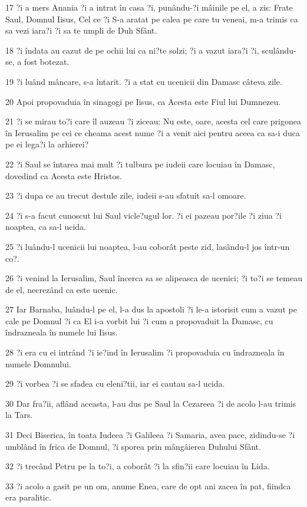 \par 17 ?i a mers Anania ?i a intrat în casa ?i, punându-?i mâinile pe el, a zis: Frate Saul, Domnul Iisus, Cel ce ?i S-a aratat pe calea pe care tu veneai, m-a trimis ca sa vezi iara?i ?i sa te umpli de Duh Sfânt.
\par 18 ?i îndata au cazut de pe ochii lui ca ni?te solzi; ?i a vazut iara?i ?i, sculându-se, a fost botezat.
\par 19 ?i luând mâncare, s-a întarit. ?i a stat cu ucenicii din Damasc câteva zile.
\par 20 Apoi propovaduia în sinagogi pe Iisus, ca Acesta este Fiul lui Dumnezeu.
\par 21 ?i se mirau to?i care îl auzeau ?i ziceau: Nu este, oare, acesta cel care prigonea în Ierusalim pe cei ce cheama acest nume ?i a venit aici pentru aceea ca sa-i duca pe ei lega?i la arhierei?
\par 22 ?i Saul se întarea mai mult ?i tulbura pe iudeii care locuiau în Damasc, dovedind ca Acesta este Hristos.
\par 23 ?i dupa ce au trecut destule zile, iudeii s-au sfatuit sa-l omoare.
\par 24 ?i s-a facut cunoscut lui Saul vicle?ugul lor. ?i ei pazeau por?ile ?i ziua ?i noaptea, ca sa-l ucida.
\par 25 ?i luându-l ucenicii lui noaptea, l-au coborât peste zid, lasându-l jos într-un co?.
\par 26 ?i venind la Ierusalim, Saul încerca sa se alipeasca de ucenici; ?i to?i se temeau de el, necrezând ca este ucenic.
\par 27 Iar Barnaba, luându-l pe el, l-a dus la apostoli ?i le-a istorisit cum a vazut pe cale pe Domnul ?i ca El i-a vorbit lui ?i cum a propovaduit la Damasc, cu îndrazneala în numele lui Iisus.
\par 28 ?i era cu ei intrând ?i ie?ind în Ierusalim ?i propovaduia cu îndrazneala în numele Domnului.
\par 29 ?i vorbea ?i se sfadea cu eleni?tii, iar ei cautau sa-l ucida.
\par 30 Dar fra?ii, aflând aceasta, l-au dus pe Saul la Cezareea ?i de acolo l-au trimis la Tars.
\par 31 Deci Biserica, în toata Iudeea ?i Galileea ?i Samaria, avea pace, zidindu-se ?i umblând în frica de Domnul, ?i sporea prin mângâierea Duhului Sfânt.
\par 32 ?i trecând Petru pe la to?i, a coborât ?i la sfin?ii care locuiau în Lida.
\par 33 ?i acolo a gasit pe un om, anume Enea, care de opt ani zacea în pat, fiindca era paralitic.
